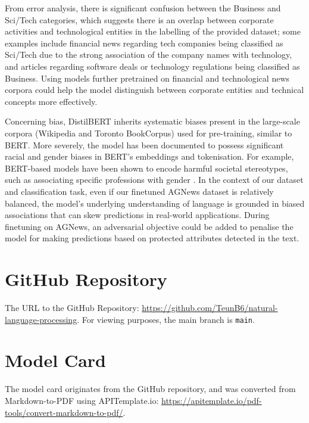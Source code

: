 \documentclass[12pt,a4paper,english]{article}
\begin{document}
From error analysis, there is significant confusion between the Business and Sci/Tech categories, which suggests there is an overlap between corporate activities and technological entities in the labelling of the provided dataset; some examples include financial news regarding tech companies being classified as Sci/Tech due to the strong association of the company names with technology, and articles regarding software deals or technology regulations being classified as Business. Using models further pretrained on financial and technological news corpora could help the model distinguish between corporate entities and technical concepts more effectively.

Concerning bias, DistilBERT inherits systematic biases present in the large-scale corpora (Wikipedia and Toronto BookCorpus) used for pre-training, similar to BERT. More severely, the model has been documented to possess significant racial and gender biases in BERT's embeddings and tokenisation. For example, BERT-based models have been shown to encode harmful societal stereotypes, such as associating specific professions with gender \cite{2d985f6031d243c5b17fb284a0e9bb28}. In the context of our dataset and classification task, even if our finetuned AGNews dataset is relatively balanced, the model's underlying understanding of language is grounded in biased associations that can skew predictions in real-world applications. During finetuning on AGNews, an adversarial objective could be added to penalise the model for making predictions based on protected attributes detected in the text.

\newpage
\printbibliography

\suppressfloats[t]
\newpage
\appendix
{}
\section{GitHub Repository}

The URL to the GitHub Repository: \href{https://github.com/TeunB6/natural-language-processing}{https://github.com/TeunB6/natural-language-processing}. For viewing purposes, the main branch is \texttt{main}.

\section{Model Card}
\label{ap:model_card}

The model card originates from the GitHub repository, and was converted from Markdown-to-PDF using APITemplate.io: \href{https://apitemplate.io/pdf-tools/convert-markdown-to-pdf/}{https://apitemplate.io/pdf-tools/convert-markdown-to-pdf/}.
\end{document}
